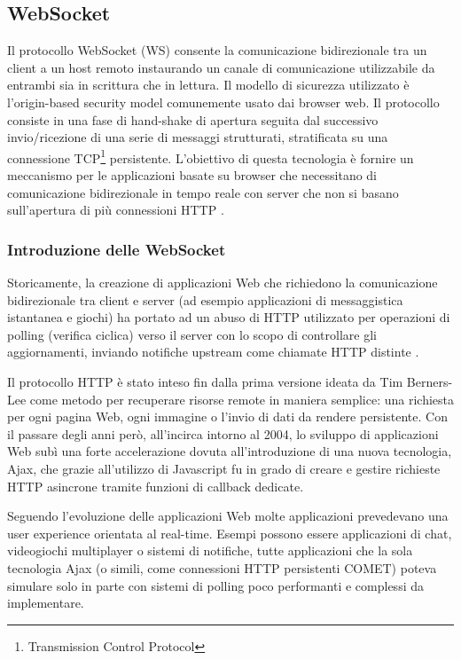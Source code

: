 \subsection{WebSocket} \label{standard_websocket}

Il protocollo WebSocket (WS) consente la comunicazione bidirezionale tra un client a un host remoto instaurando un canale di comunicazione utilizzabile da entrambi sia in scrittura che in lettura. Il modello di sicurezza utilizzato è l'origin-based security model comunemente usato dai browser web. Il protocollo consiste in una fase di hand-shake di apertura seguita dal successivo invio/ricezione di una serie di messaggi strutturati, stratificata su una connessione TCP\footnote{Transmission Control Protocol} persistente. L'obiettivo di questa tecnologia è fornire un meccanismo per le applicazioni basate su browser che necessitano di comunicazione bidirezionale in tempo reale con server che non si basano sull'apertura di più connessioni HTTP \cite{RFC6455}.

\subsubsection{Introduzione delle WebSocket}

Storicamente, la creazione di applicazioni Web che richiedono la comunicazione bidirezionale tra client e server (ad esempio applicazioni di messaggistica istantanea e giochi) ha portato ad un abuso di HTTP utilizzato per operazioni di polling (verifica ciclica) verso il server con lo scopo di controllare gli aggiornamenti, inviando notifiche upstream come chiamate HTTP distinte \cite{RFC6202}.

\medskip

Il protocollo HTTP è stato inteso fin dalla prima versione ideata da Tim Berners-Lee come metodo per recuperare risorse remote in maniera semplice: una richiesta per ogni pagina Web, ogni immagine o l’invio di dati da rendere persistente. Con il passare degli anni però, all’incirca intorno al 2004, lo sviluppo di applicazioni Web subì una forte accelerazione dovuta all’introduzione di una nuova tecnologia, Ajax, che grazie all'utilizzo di Javascript fu in grado di creare e gestire richieste HTTP asincrone tramite funzioni di callback dedicate.

\medskip

Seguendo l’evoluzione delle applicazioni Web molte applicazioni prevedevano una user experience orientata al real-time. Esempi possono essere applicazioni di chat, videogiochi multiplayer o sistemi di notifiche, tutte applicazioni che la sola tecnologia Ajax (o simili, come connessioni HTTP persistenti COMET) poteva simulare solo in parte con sistemi di polling poco performanti e complessi da implementare.

